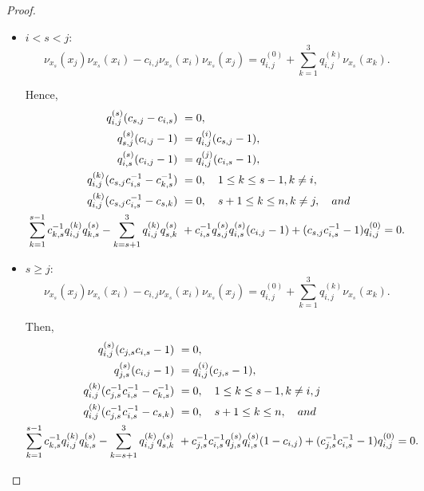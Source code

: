 \documentclass[10pt,a4paper]{amsart}
\begin{document}
\begin{proof}
\begin{itemize}
     \item $i < s < j$: 
    \begin{equation*}
        \nu_{x_s}(x_j)\nu_{x_s}(x_i)-c_{i,j}\nu_{x_s}(x_i)\nu_{x_s}(x_j) = q_{i,j}^{(0)}+\sum_{k=1}^{3}q_{i,j}^{(k)}\nu_{x_s}(x_k).
    \end{equation*}
    
    Hence, 
    \begin{align*}
        q_{i,j}^{(s)}(c_{s,j}-c_{i,s}) &\ =0, \\
        q_{s,j}^{(s)}(c_{i,j}-1) &\ = q_{i,j}^{(i)}(c_{s,j}-1), \\
        q_{i,s}^{(s)}(c_{i,j}-1) &\ = q_{i,j}^{(j)}(c_{i,s}-1), \\
        q_{i,j}^{(k)}(c_{s,j}c_{i,s}^{-1}-c_{k,s}^{-1}) &\ =0, \quad 1\leq k \leq s-1, k \ne i,  \\
        q_{i,j}^{(k)}(c_{s,j}c_{i,s}^{-1}-c_{s,k}) &\ =0, \quad s+1\leq k \leq n, k\ne j, \quad {\rm and} \\
        \sum_{k=1}^{s-1}c_{k,s}^{-1}q_{i,j}^{(k)}q_{k,s}^{(s)} -  \sum_{k=s+1}^{3}q_{i,j}^{(k)}q_{s,k}^{(s)} &\ + c_{i,s}^{-1}q_{s,j}^{(s)}q_{i,s}^{(s)}(c_{i,j}-1)  +(c_{s,j}c_{i,s}^{-1}-1)q_{i,j}^{(0)}  = 0.
    \end{align*}
    
    \item $s\geq j$: 
    \begin{equation*}
        \nu_{x_s}(x_j)\nu_{x_s}(x_i)-c_{i,j}\nu_{x_s}(x_i)\nu_{x_s}(x_j) = q_{i,j}^{(0)}+\sum_{k=1}^{3}q_{i,j}^{(k)}\nu_{x_s}(x_k).
    \end{equation*}

Then, 
    \begin{align*}
        q_{i,j}^{(s)}(c_{j,s}c_{i,s}-1) &\ =0, \\
        q_{j,s}^{(s)}(c_{i,j}-1) &\ = q_{i,j}^{(i)}(c_{j,s}-1), \\
        q_{i,j}^{(k)}(c_{j,s}^{-1}c_{i,s}^{-1}-c_{k,s}^{-1}) &\ =0, \quad 1\leq k \leq s-1, k \ne i, j\\
        q_{i,j}^{(k)}(c_{j,s}^{-1}c_{i,s}^{-1}-c_{s,k}) &\ =0, \quad s+1\leq k \leq n,  \quad {\rm and} \\
        \sum_{k=1}^{s-1}c_{k,s}^{-1}q_{i,j}^{(k)}q_{k,s}^{(s)} - \sum_{k=s+1}^{3}q_{i,j}^{(k)}q_{s,k}^{(s)}  &\ + c_{j,s}^{-1}c_{i,s}^{-1}q_{j,s}^{(s)}q_{i,s}^{(s)}(1-c_{i,j})  +(c_{j,s}^{-1}c_{i,s}^{-1}-1)q_{i,j}^{(0)}  = 0.
    \end{align*}
\end{itemize}


\end{proof}
\end{document}
